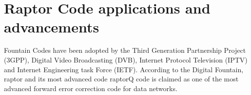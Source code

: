 \section{Raptor Code applications and advancements}
Fountain Codes have been adopted by the Third Generation Partnership Project (3GPP), Digital Video Broadcasting (DVB), Internet Protocol Television (IPTV) and Internet Engineering task Force (IETF). According to the Digital Fountain, raptor and its most advanced code raptorQ \cite{rfc6330} code is claimed as one of the most advanced forward error correction code for data networks.





























